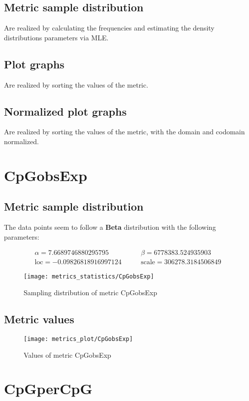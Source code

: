 \subsection{Metric sample distribution}
Are realized by calculating the frequencies and estimating the density distributions parameters via MLE.

\subsection{Plot graphs}
Are realized by sorting the values of the metric.

\subsection{Normalized plot graphs}
Are realized by sorting the values of the metric, with the domain and codomain normalized.

\clearpage
\section{CpGobsExp}
\subsection{Metric sample distribution}
The data points seem to follow a \textbf{Beta} distribution with the following parameters:

\begin{align*}
	\alpha   = 7.6689746880295795     & \qquad  \beta = 6778383.524935903       \\
	\text{loc} = -0.09826818916997124 & \qquad \text{scale} = 306278.3184506849
\end{align*}

\begin{figure}
	\texttt{[image: metrics\_statistics/CpGobsExp]}
	\caption{Sampling distribution of metric CpGobsExp}
\end{figure}
\subsection{Metric values}
\begin{figure}
	\texttt{[image: metrics\_plot/CpGobsExp]}
	\caption{Values of metric CpGobsExp}
\end{figure}

\clearpage
\section{CpGperCpG}
